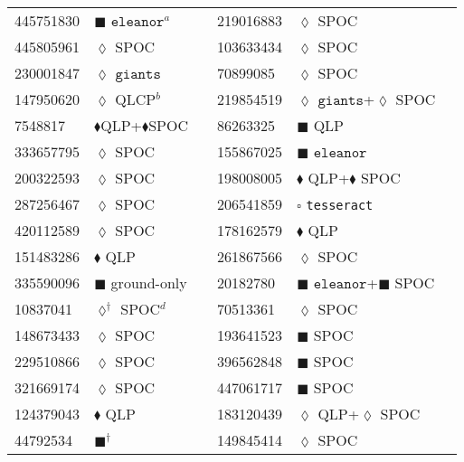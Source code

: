 \begin{longtable}{llrllr}
445751830 & $\blacksquare$ $\texttt{eleanor}^a$ & \cite{TIC_445751830} & 219016883 & $\lozenge$ SPOC & \cite{TIC_219016883} \\
445805961 & $\lozenge$ SPOC & \cite{TIC_445805961} & 103633434 &$\lozenge$ SPOC & \cite{TIC_103633434} \\
230001847 & $\lozenge$ $\texttt{giants}$ & \cite{TIC_348835438} & 70899085 & $\lozenge$ SPOC & \cite{TIC_70899085} \\
147950620 & $\lozenge$ QLCP$^b$ & \cite{TIC_147950620} & 219854519 & $\lozenge$ $\texttt{giants}$+$\lozenge$ SPOC & \cite{TIC_219854519} \\
7548817 & $\blacklozenge$QLP+$\blacklozenge$SPOC & \cite{TIC_156648452} & 86263325 & $\blacksquare$ QLP & \cite{TIC_86263325} \\
333657795 & $\lozenge$ SPOC & \cite{TIC_333657795} & 155867025 & $\blacksquare$ $\texttt{eleanor}$ & \cite{TIC_155867025} \\
200322593 & $\lozenge$ SPOC & \cite{TIC_200322593} & 198008005 & $\blacklozenge$ QLP+$\blacklozenge$ SPOC & \cite{TIC_198008005} \\
287256467 & $\lozenge$ SPOC & \cite{TIC_287256467} & 206541859 & $\square$ \texttt{tesseract} & \cite{TIC_157698565} \\
420112589 & $\lozenge$ SPOC & \cite{TIC_420112589} & 178162579 & $\blacklozenge$ QLP & \cite{TIC_156648452} \\
151483286 & $\blacklozenge$ QLP & \cite{TIC_156648452} & 261867566 & $\lozenge$ SPOC & \cite{TIC_261867566} \\
335590096 & $\blacksquare$ ground-only & \cite{TIC_335590096} & 20182780 & $\blacksquare$ $\texttt{eleanor}$+$\blacksquare$ SPOC & \cite{TIC_20182780} \\
10837041 & $\lozenge^\dagger$ SPOC$^d$ & \cite{TIC_10837041} & 70513361 & $\lozenge$ SPOC & \cite{TIC_70513361} \\
148673433 & $\lozenge$ SPOC & \cite{TIC_428699140} & 193641523 & $\blacksquare$ SPOC & \cite{TIC_193641523} \\
229510866 & $\lozenge$ SPOC & \cite{TIC_376637093} & 396562848 & $\blacksquare$ SPOC & \cite{TIC_396562848} \\
321669174 & $\lozenge$ SPOC & \cite{TIC_126606859} & 447061717 & $\blacksquare$ SPOC & \cite{TIC_447061717} \\
124379043 & $\blacklozenge$ QLP & \cite{TIC_156648452} & 183120439 & $\lozenge$ QLP+$\lozenge$ SPOC & \cite{TIC_140691463} \\
44792534 & $\blacksquare^\dagger$ & \cite{TIC_44792534} & 149845414 & $\lozenge$ SPOC & \cite{TIC_219016883} \\

\end{longtable}
